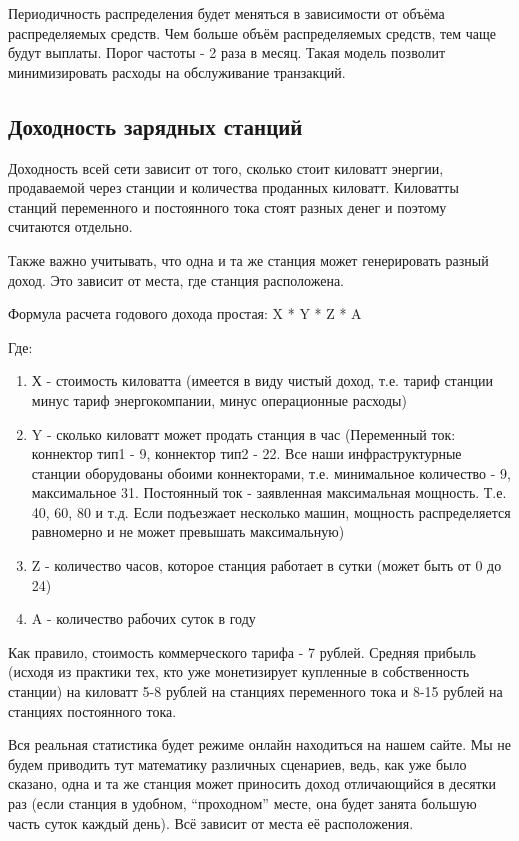 \documentclass[a4paper,12pt]{report}
\begin{document}
Периодичность распределения будет меняться в зависимости от объёма распределяемых средств. Чем больше объём распределяемых средств, тем чаще будут выплаты. Порог частоты - 2 раза в месяц. Такая модель позволит минимизировать расходы на обслуживание транзакций.

\subsection{Доходность зарядных станций}

Доходность всей сети зависит от того, сколько стоит киловатт энергии, продаваемой через станции и количества проданных киловатт. Киловатты станций переменного и постоянного тока стоят разных денег и поэтому считаются отдельно. 

Также важно учитывать, что одна и та же станция может генерировать разный доход. Это зависит от места, где станция расположена.

Формула расчета годового дохода простая: X * Y * Z * A 


Где:
\begin{enumerate}

	\item Х - стоимость киловатта (имеется в виду чистый доход, т.е. тариф станции минус тариф энергокомпании, минус операционные расходы)

	\item Y - сколько киловатт может продать станция в час (Переменный ток: коннектор тип1 - 9, коннектор тип2 - 22. Все наши инфраструктурные станции оборудованы обоими коннекторами, т.е. минимальное количество - 9, максимальное 31. Постоянный ток - заявленная максимальная мощность. Т.е. 40, 60, 80 и т.д. Если подъезжает несколько машин, мощность распределяется равномерно и не может превышать максимальную)

	\item Z - количество часов, которое станция работает в сутки (может быть от 0 до 24)
	\item A - количество рабочих суток в году 
\end{enumerate}

Как правило, стоимость коммерческого тарифа - 7 рублей. Средняя прибыль (исходя из практики тех, кто уже монетизирует купленные в собственность станции) на киловатт 5-8 рублей на станциях переменного тока и 8-15 рублей на станциях постоянного тока. 

Вся реальная статистика будет режиме онлайн находиться на нашем сайте. Мы не будем приводить тут математику различных сценариев, ведь, как уже было сказано, одна и та же станция может приносить доход отличающийся в десятки раз (если станция в удобном, “проходном” месте, она будет занята большую часть суток каждый день). Всё зависит от места её расположения.
\end{document}
